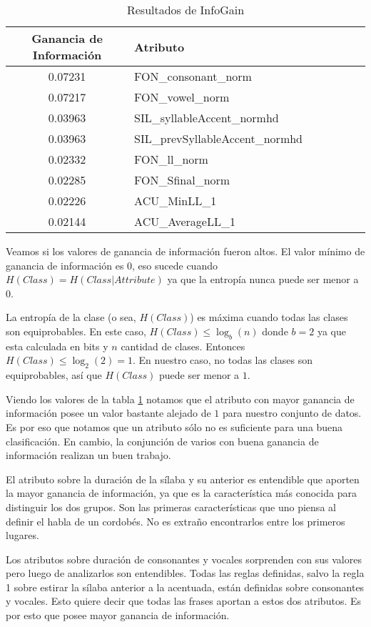 \begin{table}[H]
\centering
\begin{tabular}{|c|l|c|c|c|c|c|}
\hline
\textbf{Ganancia de Información} & \textbf{Atributo} \\ \hline
 0.07231     & FON\_consonant\_norm \\ \hline
 0.07217     & FON\_vowel\_norm \\ \hline
 0.03963     & SIL\_syllableAccent\_normhd \\ \hline
 0.03963     & SIL\_prevSyllableAccent\_normhd \\ \hline
 0.02332     & FON\_ll\_norm \\ \hline
 0.02285     & FON\_Sfinal\_norm \\ \hline
 0.02226     & ACU\_MinLL\_1 \\ \hline
 0.02144     & ACU\_AverageLL\_1 \\ \hline
\end{tabular}
\caption{Resultados de InfoGain}
\label{infogain-table}
\end{table}

Veamos si los valores de ganancia de información fueron altos. El valor mínimo de ganancia de información es $0$, eso sucede cuando $H(Class) = H(Class | Attribute)$ ya que la entropía nunca puede ser menor a $0$. 

La entropía de la clase (o sea, $H(Class)$) es máxima cuando todas las clases son equiprobables. En este caso, $H(Class) \leq \log_b (n)$ donde $b = 2$ ya que esta calculada en bits y $n$ cantidad de clases. Entonces $H(Class) \leq \log_2 (2) = 1$. En nuestro caso, no todas las clases son equiprobables, así que $H(Class)$ puede ser menor a $1$.

Viendo los valores de la tabla \ref{infogain-table} notamos que el atributo con mayor ganancia de información posee un valor bastante alejado de $1$ para nuestro conjunto de datos. Es por eso que notamos que un atributo sólo no es suficiente para una buena clasificación. En cambio, la conjunción de varios con buena ganancia de información realizan un buen trabajo.

El atributo sobre la duración de la sílaba y su anterior es entendible que aporten la mayor ganancia de información, ya que es la característica más conocida para distinguir los dos grupos. Son las primeras características que uno piensa al definir el habla de un cordobés. No es extraño encontrarlos entre los primeros lugares. 

Los atributos sobre duración de consonantes y vocales sorprenden con sus valores pero luego de analizarlos son entendibles. Todas las reglas definidas, salvo la regla 1 sobre estirar la sílaba anterior a la acentuada, están definidas sobre consonantes y vocales. Esto quiere decir que todas las frases aportan a estos dos atributos. Es por esto que posee mayor ganancia de información.

